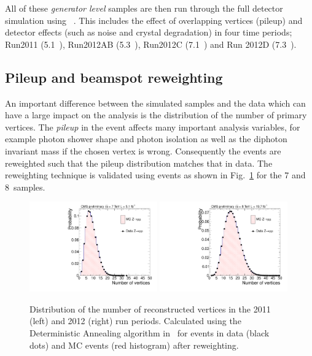 All of these \emph{generator level} samples are then run through the full \CMS detector simulation using \GEANT~\cite{geant}. This includes the effect of overlapping vertices (pileup) and detector effects (such as noise and crystal degradation) in four time periods; Run2011 (5.1~\fb), Run2012AB (5.3~\fb), Run2012C (7.1~\fb) and Run 2012D (7.3~\fb).


\subsection{Pileup and beamspot reweighting}
\label{sec:pileup_beamspot}

An important difference between the simulated samples and the data which can have a large impact on the analysis is the distribution of the number of primary vertices. The \emph{pileup} in the event affects many important analysis variables, for example photon shower shape and photon isolation as well as the diphoton invariant mass if the chosen vertex is wrong. Consequently the \MC events are reweighted such that the pileup distribution matches that in data. The reweighting technique is validated using \Zmumu events as shown in Fig.~\ref{fig:pileup} for the 7 and 8~\TeV samples. 

\begin{figure}
  \begin{center}
  \includegraphics[width=0.49\textwidth]{analysis_comps/plots/nvtx_zmumu_2011.pdf}
  \includegraphics[width=0.49\textwidth]{analysis_comps/plots/nvtx_zmumu_2012.pdf}
  \caption[Distribution of the number of reconstructed vertices]{Distribution of the number of reconstructed vertices in the 2011 (left) and 2012 (right) run periods. Calculated using the Deterministic Annealing algorithm in~\cite{deterministic_annealing} for \Zmumu events in data (black dots) and MC events (red histogram) after reweighting.}
  \label{fig:pileup}
  \end{center}
\end{figure}

